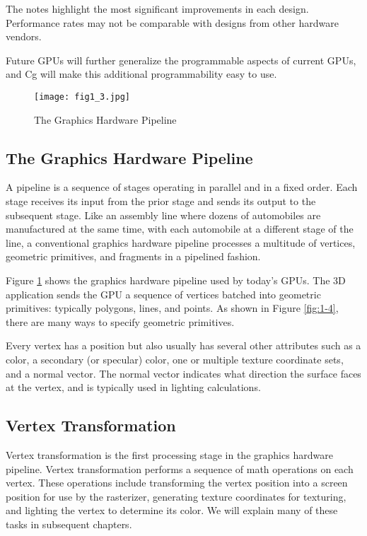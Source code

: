 \documentclass[../main.tex]{subfiles}
\begin{document}
The notes highlight the most significant improvements in each design. Performance rates may not be comparable with designs from other hardware vendors.

Future GPUs will further generalize the programmable aspects of current GPUs, and Cg will make this additional programmability easy to use.

\begin{figure}
    \centering
    \texttt{[image: fig1\_3.jpg]}
    \caption{The Graphics Hardware Pipeline}
    \label{fig:1-3}
\end{figure}

\subsection{The Graphics Hardware Pipeline}

A pipeline is a sequence of stages operating in parallel and in a fixed order. Each stage receives its input from the prior stage and sends its output to the subsequent stage. Like an assembly line where dozens of automobiles are manufactured at the same time, with each automobile at a different stage of the line, a conventional graphics hardware pipeline processes a multitude of vertices, geometric primitives, and fragments in a pipelined fashion.

Figure \ref{fig:1-3} shows the graphics hardware pipeline used by today's GPUs. The 3D application sends the GPU a sequence of vertices batched into geometric primitives: typically polygons, lines, and points. As shown in Figure \ref{fig:1-4}, there are many ways to specify geometric primitives.

Every vertex has a position but also usually has several other attributes such as a color, a secondary (or specular) color, one or multiple texture coordinate sets, and a normal vector. The normal vector indicates what direction the surface faces at the vertex, and is typically used in lighting calculations.

\subsection*{Vertex Transformation}

Vertex transformation is the first processing stage in the graphics hardware pipeline. Vertex transformation performs a sequence of math operations on each vertex. These operations include transforming the vertex position into a screen position for use by the rasterizer, generating texture coordinates for texturing, and lighting the vertex to determine its color. We will explain many of these tasks in subsequent chapters.
\end{document}
